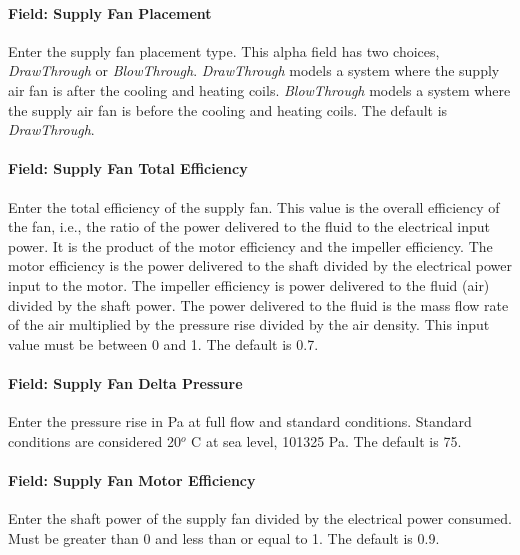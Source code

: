 \paragraph{Field: Supply Fan Placement}\label{field-supply-fan-placement-1}

Enter the supply fan placement type. This alpha field has two choices, \emph{DrawThrough} or \emph{BlowThrough}. \emph{DrawThrough} models a system where the supply air fan is after the cooling and heating coils. \emph{BlowThrough} models a system where the supply air fan is before the cooling and heating coils. The default is \emph{DrawThrough}.

\paragraph{Field: Supply Fan Total Efficiency}\label{field-supply-fan-total-efficiency-2}

Enter the total efficiency of the supply fan. This value is the overall efficiency of the fan, i.e., the ratio of the power delivered to the fluid to the electrical input power. It is the product of the motor efficiency and the impeller efficiency. The motor efficiency is the power delivered to the shaft divided by the electrical power input to the motor. The impeller efficiency is power delivered to the fluid (air) divided by the shaft power. The power delivered to the fluid is the mass flow rate of the air multiplied by the pressure rise divided by the air density. This input value must be between 0 and 1. The default is 0.7.

\paragraph{Field: Supply Fan Delta Pressure}\label{field-supply-fan-delta-pressure-1}

Enter the pressure rise in Pa at full flow and standard conditions. Standard conditions are considered 20\(^{o}\) C at sea level, 101325 Pa. The default is 75.

\paragraph{Field: Supply Fan Motor Efficiency}\label{field-supply-fan-motor-efficiency-2}

Enter the shaft power of the supply fan divided by the electrical power consumed. Must be greater than 0 and less than or equal to 1. The default is 0.9.

